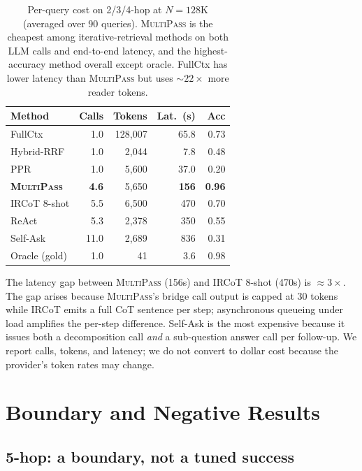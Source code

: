 \documentclass{article}
\theoremstyle{plain}
\theoremstyle{definition}
\newcommand{\ours}{\textsc{MultiPass}}
\begin{document}
\begin{table}[t]
\centering
\caption{Per-query cost on 2/3/4-hop at $N{=}128$K (averaged over 90
queries). \ours{} is the cheapest among iterative-retrieval methods on
both LLM calls and end-to-end latency, and the highest-accuracy method
overall except oracle. FullCtx has lower latency than \ours{} but uses
${\sim}22\times$ more reader tokens.}
\label{tab:cost}
\small
\begin{tabular}{@{}lrrrr@{}}
\toprule
Method & Calls & Tokens & Lat.~(s) & Acc \\
\midrule
FullCtx & 1.0 & 128{,}007 & 65.8 & 0.73 \\
Hybrid-RRF & 1.0 & 2{,}044 & 7.8 & 0.48 \\
PPR & 1.0 & 5{,}600 & 37.0 & 0.20 \\
\textbf{\ours{}} & \textbf{4.6} & 5{,}650 & \textbf{156} & \textbf{0.96} \\
IRCoT 8-shot & 5.5 & 6{,}500 & 470 & 0.70 \\
ReAct & 5.3 & 2{,}378 & 350 & 0.55 \\
Self-Ask & 11.0 & 2{,}689 & 836 & 0.31 \\
\midrule
Oracle (gold) & 1.0 & 41 & 3.6 & 0.98 \\
\bottomrule
\end{tabular}
\end{table}

The latency gap between \ours{} (156s) and IRCoT 8-shot (470s) is
${\approx}3\times$. The gap arises because \ours{}'s bridge call output is
capped at 30 tokens while IRCoT emits a full CoT sentence per step;
asynchronous queueing under load amplifies the per-step difference.
Self-Ask is the most expensive because it issues both a decomposition call
\emph{and} a sub-question answer call per follow-up. We report calls,
tokens, and latency; we do not convert to dollar cost because the
provider's token rates may change.

\section{Boundary and Negative Results}\label{sec:boundary}

\subsection{5-hop: a boundary, not a tuned success}\label{sec:saturation}
\end{document}

